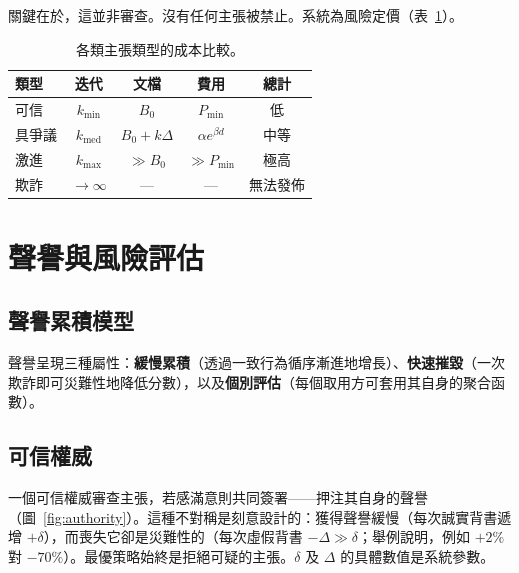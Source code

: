 \documentclass[11pt,a4paper,twocolumn]{article}
\begin{document}
關鍵在於，這並非審查。沒有任何主張被禁止。系統為風險定價（表~\ref{tab:costs}）。

\begin{table}[ht]
\centering
\caption{各類主張類型的成本比較。}
\label{tab:costs}
\footnotesize
\begin{tabular}{@{}lcccc@{}}
\toprule
\textbf{類型} & \textbf{迭代} & \textbf{文檔} & \textbf{費用} & \textbf{總計} \\
\midrule
可信 & $k_{\min}$ & $B_0$ & $P_{\min}$ & 低 \\
具爭議 & $k_{\text{med}}$ & $B_0{+}k\Delta$ & $\alpha e^{\beta d}$ & 中等 \\
激進 & $k_{\max}$ & $\gg B_0$ & $\gg P_{\min}$ & 極高 \\
欺詐 & $\to\infty$ & --- & --- & 無法發佈 \\
\bottomrule
\end{tabular}
\end{table}

\section{聲譽與風險評估}

\subsection{聲譽累積模型}

聲譽呈現三種屬性：\textbf{緩慢累積}（透過一致行為循序漸進地增長）、\textbf{快速摧毀}（一次欺詐即可災難性地降低分數），以及\textbf{個別評估}（每個取用方可套用其自身的聚合函數）。

\subsection{可信權威}

一個可信權威審查主張，若感滿意則共同簽署——押注其自身的聲譽（圖~\ref{fig:authority}）。這種不對稱是刻意設計的：獲得聲譽緩慢（每次誠實背書遞增 $+\delta$），而喪失它卻是災難性的（每次虛假背書 $-\Delta \gg \delta$；舉例說明，例如 $+2\%$ 對 $-70\%$）。最優策略始終是拒絕可疑的主張。$\delta$ 及 $\Delta$ 的具體數值是系統參數。
\end{document}
